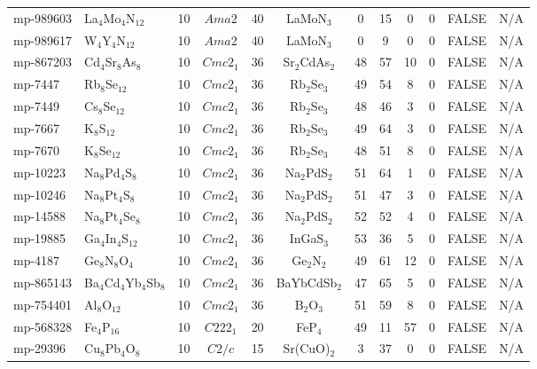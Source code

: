{\begin{longtable}{llcccccccccc}
    mp-989603 & La$_{4}$Mo$_{4}$N$_{12}$ & 10    & $Ama2$ & 40    & LaMoN$_{3}$ & 0     & 15    & 0     & 0     & FALSE & N/A \\
    mp-989617 & W$_{4}$Y$_{4}$N$_{12}$ & 10    & $Ama2$ & 40    & LaMoN$_{3}$ & 0     & 9     & 0     & 0     & FALSE & N/A \\
    mp-867203 & Cd$_{4}$Sr$_{8}$As$_{8}$ & 10    & $Cmc2_1$ & 36    & Sr$_{2}$CdAs$_{2}$ & 48    & 57    & 10    & 0     & FALSE & N/A \\
    mp-7447 & Rb$_{8}$Se$_{12}$ & 10    & $Cmc2_1$ & 36    & Rb$_{2}$Se$_{3}$ & 49    & 54    & 8     & 0     & FALSE & N/A \\
    mp-7449 & Cs$_{8}$Se$_{12}$ & 10    & $Cmc2_1$ & 36    & Rb$_{2}$Se$_{3}$ & 48    & 46    & 3     & 0     & FALSE & N/A \\
    mp-7667 & K$_{8}$S$_{12}$ & 10    & $Cmc2_1$ & 36    & Rb$_{2}$Se$_{3}$ & 49    & 64    & 3     & 0     & FALSE & N/A \\
    mp-7670 & K$_{8}$Se$_{12}$ & 10    & $Cmc2_1$ & 36    & Rb$_{2}$Se$_{3}$ & 48    & 51    & 8     & 0     & FALSE & N/A \\
    mp-10223 & Na$_{8}$Pd$_{4}$S$_{8}$ & 10    & $Cmc2_1$ & 36    & Na$_{2}$PdS$_{2}$ & 51    & 64    & 1     & 0     & FALSE & N/A \\
    mp-10246 & Na$_{8}$Pt$_{4}$S$_{8}$ & 10    & $Cmc2_1$ & 36    & Na$_{2}$PdS$_{2}$ & 51    & 47    & 3     & 0     & FALSE & N/A \\
    mp-14588 & Na$_{8}$Pt$_{4}$Se$_{8}$ & 10    & $Cmc2_1$ & 36    & Na$_{2}$PdS$_{2}$ & 52    & 52    & 4     & 0     & FALSE & N/A \\
    mp-19885 & Ga$_{4}$In$_{4}$S$_{12}$ & 10    & $Cmc2_1$ & 36    & InGaS$_{3}$ & 53    & 36    & 5     & 0     & FALSE & N/A \\
    mp-4187 & Ge$_{8}$N$_{8}$O$_{4}$ & 10    & $Cmc2_1$ & 36    & Ge$_{2}$N$_{2}$ & 49    & 61    & 12    & 0     & FALSE & N/A \\
    mp-865143 & Ba$_{4}$Cd$_{4}$Yb$_{4}$Sb$_{8}$ & 10    & $Cmc2_1$ & 36    & BaYbCdSb$_{2}$ & 47    & 65    & 5     & 0     & FALSE & N/A \\
    mp-754401 & Al$_{8}$O$_{12}$ & 10    & $Cmc2_1$ & 36    & B$_{2}$O$_{3}$ & 51    & 59    & 8     & 0     & FALSE & N/A \\
    mp-568328 & Fe$_{4}$P$_{16}$ & 10    & $C222_1$ & 20    & FeP$_{4}$ & 49    & 11    & 57    & 0     & FALSE & N/A \\
    mp-29396 & Cu$_{8}$Pb$_{4}$O$_{8}$ & 10    & $C2/c$ & 15    & Sr(CuO)$_{2}$ & 3     & 37    & 0     & 0     & FALSE & N/A \\

\end{longtable}}
